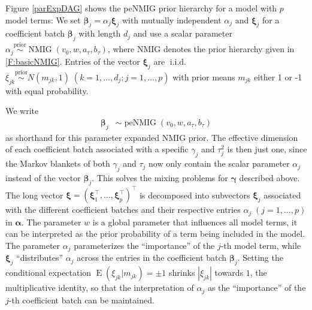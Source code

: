 \documentclass[article, shortnames, nojss, noheadings, notitle]{jss}
\newcommand{\priorsim}{\stackrel{\text{prior}}{\sim}}
\newcommand{\EW}{\operatorname{E}}
\newcommand{\iid} {\operatorname{i.i.d.}}
\begin{document}
Figure \ref{parExpDAG} shows the peNMIG
prior hierarchy for a model with $p$ model terms: We set
$\bm \beta_j = \alpha_j \bm\xi_j$ with mutually independent $\alpha_j$ and $\bm
\xi_j$ for a coefficient batch $\bm\beta_j$ with
length $d_j$ and use a scalar parameter $\alpha_j \priorsim
\operatorname{NMIG}(v_0, w, a_\tau, b_\tau)$, where NMIG
denotes the prior hierarchy given in \eqref{F:basicNMIG}. Entries of
the vector $\bm\xi_j$ are $\iid$ \mbox{$\xi_{jk}
\priorsim N(m_{jk},1)\;(k=1,\dots,d_j; j=1,\dots,p)$} with prior means $m_{jk}$ either 1 or -1 with equal probability.

We write
\begin{align}\label{F:peNMIG}
\bm\beta_j &\sim \operatorname{peNMIG}(v_0, w, a_\tau, b_\tau)
\end{align}
as shorthand for this parameter expanded NMIG prior.
The effective dimension of each coefficient batch associated with
a specific $\gamma_j$ and $\tau^2_j$ is then just one,
since the Markov blankets of both $\gamma_j$ and
$\tau_j$ now only contain the scalar parameter $\alpha_j$ instead of
the vector $\bm \beta_j$. This solves the
mixing problems for $\bm\gamma$ described above.
The long vector $\bm \xi=(\bm \xi_1^\top, \dots,\bm \xi_p^\top)^\top$ is
decomposed into subvectors $\bm \xi_j$ associated with the different
coefficient batches and their respective entries $\alpha_j\;(j=1,\ldots,p)$ in $\bm\alpha$. The parameter $w$ is a global parameter that
influences all model terms, it can be interpreted as the prior probability of a
term being included in the model. The parameter $\alpha_j$ parameterizes
the ``importance'' of the $j$-th model term, while $\bm\xi_j$
``distributes'' $\alpha_j$ across the entries in the coefficient batch $\bm \beta_j$.
Setting the conditional expectation $\EW(\xi_{jk}|m_{jk}) = \pm 1$ shrinks $|\xi_{jk}|$ towards $1$, the
multiplicative identity, so that the interpretation of $\alpha_j$ as
the ``importance'' of the $j$-th coefficient batch can be maintained.
\end{document}
